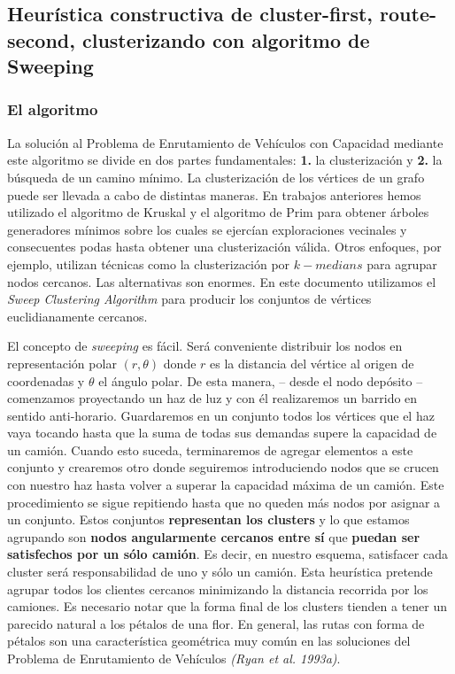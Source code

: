 \subsection{Heurística constructiva de cluster-first, route-second, clusterizando con algoritmo de Sweeping}
\subsubsection{El algoritmo}
La solución al Problema de Enrutamiento de Vehículos con Capacidad mediante este algoritmo se divide en dos partes fundamentales: \textbf{1.} la clusterización y \textbf{2.} la búsqueda de un camino mínimo. La clusterización de los vértices de un grafo puede ser llevada a cabo de distintas maneras. En trabajos anteriores hemos utilizado el algoritmo de Kruskal y el algoritmo de Prim para obtener árboles generadores mínimos sobre los cuales se ejercían exploraciones vecinales y consecuentes podas hasta obtener una clusterización válida. Otros enfoques, por ejemplo, utilizan técnicas como la clusterización por $k-medians$ para agrupar nodos cercanos. Las alternativas son enormes. En este documento utilizamos el \textit{Sweep Clustering Algorithm} para producir los conjuntos de vértices euclidianamente cercanos.

\vskip 8pt

El concepto de \textit{sweeping} es fácil. Será conveniente distribuir los nodos en representación polar $(r, \theta)$ donde $r$ es la distancia del vértice al origen de coordenadas y $\theta$ el ángulo polar. De esta manera, – desde el nodo depósito – comenzamos proyectando un haz de luz y con él realizaremos un barrido en sentido anti-horario. Guardaremos en un conjunto todos los vértices que el haz vaya tocando hasta que la suma de todas sus demandas supere la capacidad de un camión. Cuando esto suceda, terminaremos de agregar elementos a este conjunto y crearemos otro donde seguiremos introduciendo nodos que se crucen con nuestro haz hasta volver a superar la capacidad máxima de un camión. Este procedimiento se sigue repitiendo hasta que no queden más nodos por asignar a un conjunto. Estos conjuntos \textbf{representan los clusters} y lo que estamos agrupando son \textbf{nodos angularmente cercanos entre sí} que \textbf{puedan ser satisfechos por un sólo camión}. Es decir, en nuestro esquema, satisfacer cada cluster será responsabilidad de uno y sólo un camión. Esta heurística pretende agrupar todos los clientes cercanos minimizando la distancia recorrida por los camiones. Es necesario notar que la forma final de los clusters tienden a tener un parecido natural a los pétalos de una flor. En general, las rutas con forma de pétalos son una característica geométrica muy común en las soluciones del Problema de Enrutamiento de Vehículos \textit{(Ryan et al. 1993a)}.


